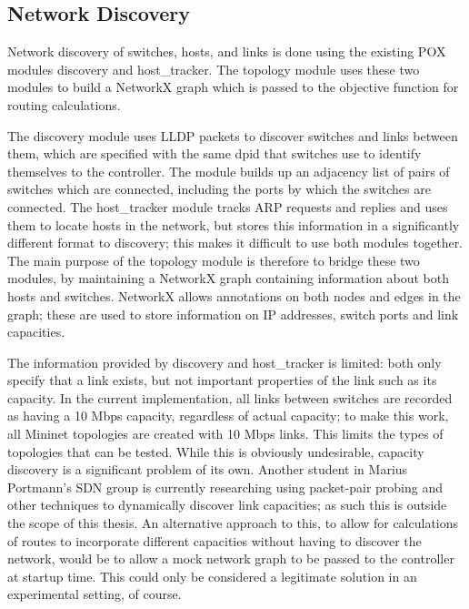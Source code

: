 \subsection{Network Discovery}
Network discovery of switches, hosts, and links is done using the existing POX modules discovery and host\_tracker. The topology module uses these two modules to build a NetworkX graph which is passed to the objective function for routing calculations.

The discovery module uses LLDP packets to discover switches and links between them, which are specified with the same dpid that switches use to identify themselves to the controller. The module builds up an adjacency list of pairs of switches which are connected, including the ports by which the switches are connected. The host\_tracker module tracks ARP requests and replies and uses them to locate hosts in the network, but stores this information in a significantly different format to discovery; this makes it difficult to use both modules together. The main purpose of the topology module is therefore to bridge these two modules, by maintaining a NetworkX graph containing information about both hosts and switches. NetworkX allows annotations on both nodes and edges in the graph; these are used to store information on IP addresses, switch ports and link capacities.

The information provided by discovery and host\_tracker is limited: both only specify that a link exists, but not important properties of the link such as its capacity. In the current implementation, all links between switches are recorded as having a 10 Mbps capacity, regardless of actual capacity; to make this work, all Mininet topologies are created with 10 Mbps links. This limits the types of topologies that can be tested. While this is obviously undesirable, capacity discovery is a significant problem of its own. Another student in Marius Portmann's SDN group is currently researching using packet-pair probing and other techniques to dynamically discover link capacities; as such this is outside the scope of this thesis. An alternative approach to this, to allow for calculations of routes to incorporate different capacities without having to discover the network, would be to allow a mock network graph to be passed to the controller at startup time. This could only be considered a legitimate solution in an experimental setting, of course.

